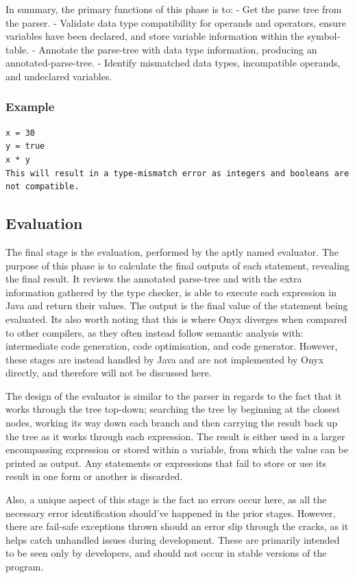 \documentclass[
]{report}
\begin{document}
In summary, the primary functions of this phase is to: - Get the parse
tree from the parser. - Validate data type compatibility for operands
and operators, ensure variables have been declared, and store variable
information within the \gls{symbol-table}. - Annotate the \gls{parse-tree} with data
type information, producing an \gls{annotated-parse-tree}. - Identify
mismatched data types, incompatible operands, and undeclared variables.

\subsubsection{Example}
\begin{verbatim}
x = 30
y = true
x * y
This will result in a type-mismatch error as integers and booleans are not compatible.
\end{verbatim}

\subsection{Evaluation}
The final stage is the evaluation, performed by the aptly named
evaluator. The purpose of this phase is to calculate the final outputs
of each \gls{statement}, revealing the final result. It reviews the annotated
\gls{parse-tree} and with the extra information gathered by the type checker,
is able to execute each \gls{expression} in Java and return their values. The
output is the final value of the \gls{statement} being evaluated. Its also
worth noting that this is where Onyx diverges when compared to other
compilers, as they often instead follow semantic analysis with:
intermediate code generation, code optimisation, and code generator.
However, these stages are instead handled by Java and are not
implemented by Onyx directly, and therefore will not be discussed here.

The design of the evaluator is similar to the parser in regards to the
fact that it works through the tree top-down; searching the tree by
beginning at the closest nodes, working its way down each branch and
then carrying the result back up the tree as it works through each
\gls{expression}. The result is either used in a larger encompassing
\gls{expression} or stored within a variable, from which the value can be
printed as output. Any \glspl{statement} or \glspl{expression} that fail to store or
use its result in one form or another is discarded.

Also, a unique aspect of this stage is the fact no errors occur here, as
all the necessary error identification should've happened in the prior
stages. However, there are fail-safe exceptions thrown should an error
slip through the cracks, as it helps catch unhandled issues during
development. These are primarily intended to be seen only by developers,
and should not occur in stable versions of the program.
\end{document}

